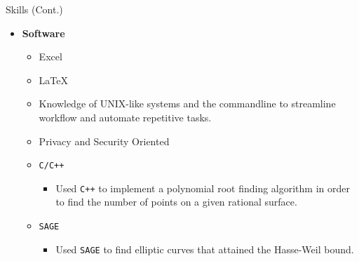 \documentclass{resume} %
\begin{document}
\begin{rSection}{Skills (Cont.)}
    \begin{itemize}
        \item \textbf{Software}
            \begin{itemize}
                \item Excel

                \item \LaTeX

                \item Knowledge of UNIX-like systems and the commandline to
                    streamline workflow and automate repetitive tasks.

                \item Privacy and Security Oriented

                \item \lstinline{C/C++}
                    \begin{itemize}
                        \item[\circ] Used \lstinline{C++} to implement a
                            polynomial root finding algorithm in order to find
                            the number of points on a given rational surface.
                    \end{itemize}

                \item \lstinline{SAGE}
                    \begin{itemize}
                        \item[\circ] Used \lstinline{SAGE} to find elliptic
                            curves that attained the Hasse-Weil bound.
                    \end{itemize}
            \end{itemize}
    \end{itemize}
\end{rSection}
\end{document}
